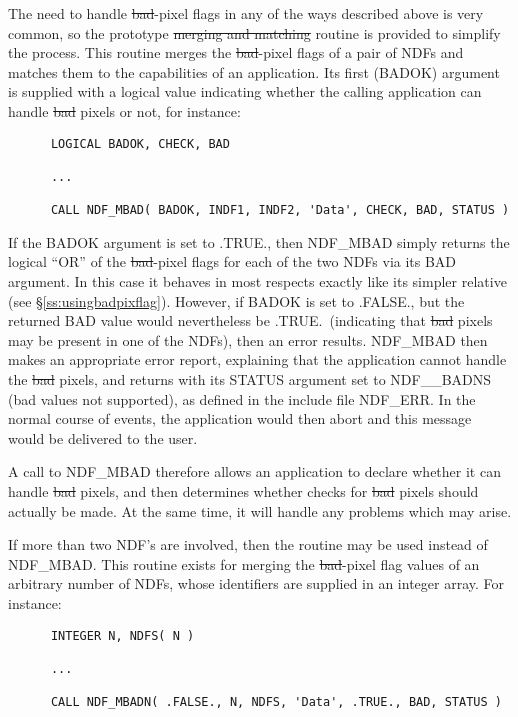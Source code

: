 The need to handle \st{bad\/}-pixel flags in any of the ways described above
is very common, so the prototype \st{merging and matching\/} routine
 is provided to simplify the process.
This routine merges the \st{bad\/}-pixel flags of a pair of NDFs and matches
them to the capabilities of an application.
Its first (BADOK) argument is supplied with a logical value indicating whether
the calling application can handle \st{bad\/} pixels or not, for instance: 

\small
\begin{verbatim}
      LOGICAL BADOK, CHECK, BAD

      ...

      CALL NDF_MBAD( BADOK, INDF1, INDF2, 'Data', CHECK, BAD, STATUS )
\end{verbatim}
\normalsize

If the BADOK argument is set to .TRUE., then NDF\_MBAD simply returns
the logical ``OR'' of the \st{bad\/}-pixel flags for each of the two NDFs via 
its BAD argument.
In this case it behaves in most respects exactly like its simpler relative
 (see \S\ref{ss:usingbadpixflag}). 
However, if BADOK is set to .FALSE., but the returned BAD value would
nevertheless be .TRUE.\ (indicating that \st{bad\/} pixels may be present in
one of the NDFs), then an error results. 
NDF\_MBAD then makes an appropriate error report, explaining that the
application cannot handle the \st{bad\/} pixels, and returns with its STATUS
argument set to NDF\_\_BADNS (bad values not supported), as defined in the
include file NDF\_ERR. 
In the normal course of events, the application would then abort and this
message would be delivered to the user. 

A call to NDF\_MBAD therefore allows an application to declare whether it
can handle \st{bad\/} pixels, and then determines whether checks for \st{bad\/}
pixels should actually be made. 
At the same time, it will handle any problems which may arise. 

If more than two NDF's are involved, then the routine  may be 
used instead of NDF\_MBAD.
This routine exists for merging the \st{bad}-pixel flag values of an
arbitrary number of NDFs, whose identifiers are supplied in an integer
array. 
For instance: 

\small
\begin{verbatim}
      INTEGER N, NDFS( N )

      ...

      CALL NDF_MBADN( .FALSE., N, NDFS, 'Data', .TRUE., BAD, STATUS )
\end{verbatim}
\normalsize

